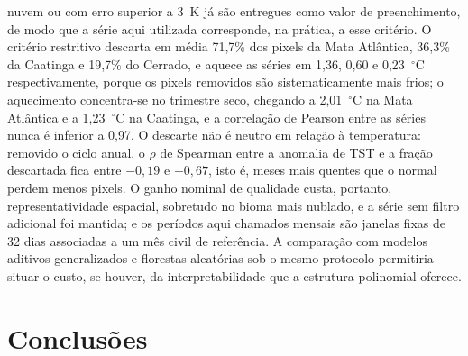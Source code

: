 \documentclass[a4paper,fleqn]{cas-dc}
\begin{document}
nuvem ou com erro superior a 3~K já são entregues como valor de preenchimento, de modo que a série aqui utilizada corresponde, na prática, a esse critério. O critério restritivo descarta em média 71,7\% dos pixels da Mata Atlântica, 36,3\% da Caatinga e 19,7\% do Cerrado, e aquece as séries em 1,36, 0,60 e 0,23~$^{\circ}$C respectivamente, porque os pixels removidos são sistematicamente mais frios; o aquecimento concentra-se no trimestre seco, chegando a 2,01~$^{\circ}$C na Mata Atlântica e a 1,23~$^{\circ}$C na Caatinga, e a correlação de Pearson entre as séries nunca é inferior a 0,97. O descarte não é neutro em relação à temperatura: removido o ciclo anual, o $\rho$ de Spearman entre a anomalia de TST e a fração descartada fica entre $-0{,}19$ e $-0{,}67$, isto é, meses mais quentes que o normal perdem menos pixels. O ganho nominal de qualidade custa, portanto, representatividade espacial, sobretudo no bioma mais nublado, e a série sem filtro adicional foi mantida; e os períodos aqui chamados mensais são janelas fixas de 32 dias associadas a um mês civil de referência. A comparação com modelos aditivos generalizados e florestas aleatórias sob o mesmo protocolo permitiria situar o custo, se houver, da interpretabilidade que a estrutura polinomial oferece.

\section{Conclusões}\label{sec:conclusions}
\end{document}
